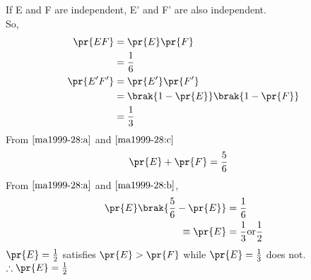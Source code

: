 
If E and F are independent, E' and F' are also independent.\\So,
\begin{align}
    \pr{EF}&=\pr{E}\pr{F}\nonumber\\
            &=\frac{1}{6}\label{ma1999-28:a}\\
    \pr{E'F'}&=\pr{E'}\pr{F'}\nonumber\\
            &=\brak{1-\pr{E}}\brak{1-\pr{F}}\nonumber\\
            &=\frac{1}{3}\label{ma1999-28:c}
\end{align}
From $\eqref{ma1999-28:a}$ and $\eqref{ma1999-28:c}$
\begin{align}
    \pr{E}+\pr{F}&=\frac{5}{6}\label{ma1999-28:b}
\end{align}
From $\eqref{ma1999-28:a}$ and $\eqref{ma1999-28:b}$,
\begin{align}
    \pr{E}\brak{\frac{5}{6}-\pr{E}}&=\frac{1}{6}\nonumber\\
\equiv \pr{E}&=\frac{1}{3}\text{or}\frac{1}{2}\nonumber
\end{align}
$\pr{E}=\frac{1}{2}$ satisfies $\pr{E}>\pr{F}$ while $\pr{E}=\frac{1}{3}$ does not.\\
$\therefore \pr{E}=\frac{1}{2}$\\

